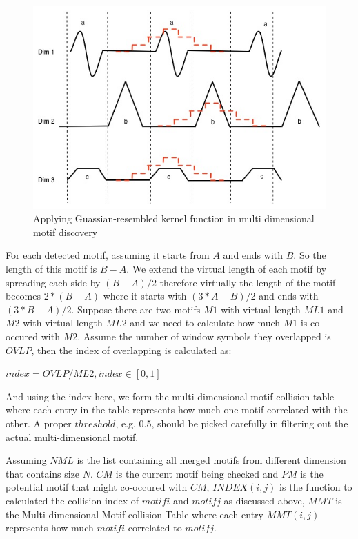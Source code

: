 \documentclass{article}
\begin{document}
\begin{figure}
  \centering
  \includegraphics[scale=0.3]{MultiDimensionalMotif}
  \caption{Applying Guassian-resembled kernel function in multi dimensional motif discovery}
\end{figure}

For each detected motif, assuming it starts from $A$ and ends with $B$. So the length of this motif is $B-A$. We extend the virtual 
length of each motif by spreading each side by $(B-A)/2$ therefore virtually the length of the motif becomes $2*(B-A)$ where it starts
with $(3*A-B)/2$ and ends with $(3*B-A)/2$. Suppose there are two motifs $M1$ with virtual length $ML1$ and $M2$ with virtual length
$ML2$ and we need to calculate how much $M1$ is co-occured with $M2$. Assume the number of window symbols they overlapped is $OVLP$, 
then the index of overlapping is calculated as:

\begin{center}
$ index = OVLP/ML2, index \in [0,1]$
\end{center}

And using the index here, we form the multi-dimensional motif collision table where each entry in the table represents 
how much one motif correlated with the other. A proper $threshold$, e.g. 0.5, should be picked carefully in filtering out the actual multi-dimensional motif.  

Assuming $NML$ is the list containing all merged motifs from different dimension that contains size $N$. $CM$ is the current motif being checked and $PM$ is the potential motif that might co-occured with $CM$, $INDEX(i,j)$ is the function to calculated the collision index of $motif i$ and $motif j$ as discussed above, $MMT$ is the Multi-dimensional Motif collision Table where each entry $MMT(i,j)$ represents how much $motif i$ correlated to $motif j$. 
\end{document}
